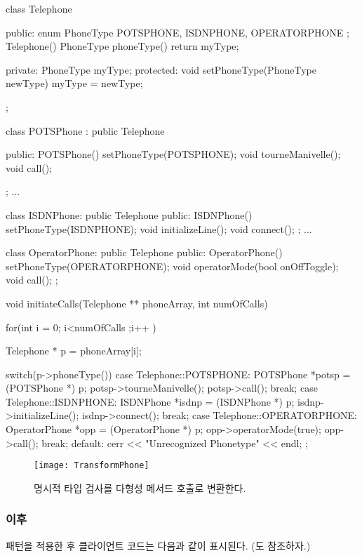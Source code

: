 \documentclass[a4paper,10pt,twoside]{book}
\begin{document}
\begin{code}
class Telephone {
public:
	enum PhoneType {
		POTSPHONE, ISDNPHONE, OPERATORPHONE
		};
	Telephone() {}
	PhoneType phoneType() { return myType; }

private:
	PhoneType myType;
protected: 
	void setPhoneType(PhoneType newType) { myType = newType; }
};

class POTSPhone : public Telephone {

public: 
	POTSPhone() { setPhoneType(POTSPHONE); }
	void tourneManivelle();
	void call();
};
...

class ISDNPhone: public Telephone {
public:
	ISDNPhone() { setPhoneType(ISDNPHONE);}
	void initializeLine();
	void connect();
};
...

class OperatorPhone: public Telephone {
public: 
	OperatorPhone() { setPhoneType(OPERATORPHONE); }
	void operatorMode(bool onOffToggle);
	void call();
};

void initiateCalls(Telephone ** phoneArray, int numOfCalls) {
	for(int i = 0; i<numOfCalls ;i++ ) {
		Telephone * p = phoneArray[i];

		switch(p->phoneType()) {
		case Telephone::POTSPHONE: {
			POTSPhone *potsp = (POTSPhone *) p;
			potsp->tourneManivelle();
			potsp->call();
			break;
		}
		case Telephone::ISDNPHONE: {
			ISDNPhone *isdnp = (ISDNPhone *) p;
			isdnp->initializeLine();
			isdnp->connect();
			break;
		}
		case Telephone::OPERATORPHONE: {
			OperatorPhone *opp = (OperatorPhone *) p;
			opp->operatorMode(true);
			opp->call();
			break;
		}
		default:	cerr << "Unrecognized Phonetype" << endl;
		};
	}
}
\end{code}

\begin{figure}
\begin{center}
\texttt{[image: TransformPhone]}
\caption{명시적 타입 검사를 다형성 메서드 호출로 변환한다.}
\end{center}
\end{figure}

\subsubsection*{이후}

패턴을 적용한 후 클라이언트 코드는 다음과 같이 표시된다.
(도 참조하자.)
\end{document}

